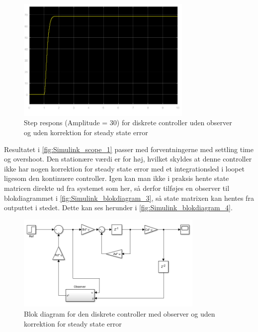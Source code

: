 \begin{figure}[H]
	\centering
	\includegraphics[width = 0.75\textwidth]{figur/Simulink_scope_3}
	\caption{Step respons (Amplitude = 30) for diskrete controller uden observer og uden korrektion for steady state error}
	\label{fig:Simulink_scope_3}
\end{figure}

Resultatet i \autoref{fig:Simulink_scope_1} passer med forventningerne med settling time og overshoot. Den stationære værdi er for høj, hvilket skyldes at denne controller ikke har nogen korrektion for steady state error med et integrationsled i loopet ligesom den kontinuere controller. Igen kan man ikke i praksis hente state matricen direkte ud fra systemet som her, så derfor tilføjes en observer til blokdiagrammet i \autoref{fig:Simulink_blokdiagram_3}, så state matrixen kan hentes fra outputtet i stedet. Dette kan ses herunder i \autoref{fig:Simulink_blokdiagram_4}.

\begin{figure}[H]
	\centering
	\includegraphics[width = 0.8\textwidth]{figur/Simulink_blokdiagram_4}
	\caption{Blok diagram for den diskrete controller med observer og uden korrektion for steady state error}
	\label{fig:Simulink_blokdiagram_4}
\end{figure}


